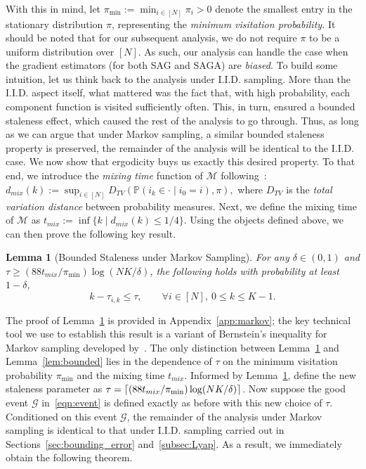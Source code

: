 \documentclass{article}
\theoremstyle{plain}
\newtheorem{lemma}[theorem]{Lemma}
\theoremstyle{definition}
\newcommand{\cG}{\mathcal{G}}
\newcommand{\cM}{\mathcal{M}}
\DeclarePairedDelimiter{\ceil}{\lceil}{\rceil}
\begin{document}
With this in mind, let $\pi_{\min}:=\min_{i\in[N]}\pi_i >0$ denote the smallest entry in the stationary distribution $\pi$, representing the \emph{minimum visitation probability.} It should be noted that for our subsequent analysis, we do not require $\pi$ to be a uniform distribution over $[N]$. As such, our analysis can handle the case when the gradient estimators (for both SAG and SAGA) are \emph{biased}. To build some intuition, let us think back to the analysis under I.I.D. sampling. More than the I.I.D. aspect itself, what mattered was the fact that, with high probability, each component function is visited sufficiently often. This, in turn, ensured a bounded staleness effect, which caused the rest of the analysis to go through. Thus, as long as we can argue that under Markov sampling, a similar bounded staleness property is preserved, the remainder of the analysis will be identical to the I.I.D. case. We now show that ergodicity buys us exactly this desired property. To that end, we introduce the \textit{mixing time} function of $\cM$ following~\citet{dorfman}: $d_{mix}(k) := \sup_{i \in [N]} D_{TV}\left(\mathbb{P}(i_k \in \cdot\mid i_0 =i), \pi \right),$ where $D_{TV}$ is the \textit{total variation distance} between probability measures. Next, we define the mixing time of $\cM$ as $t_{mix} := \inf \{k\mid d_{mix}(k) \leq 1/4\}$. Using the objects defined above, we can then prove the following key result. 


\begin{lemma}[Bounded Staleness under Markov Sampling]\label{lem:bounded_markov}
For any $\delta\in(0,1)$ and $\tau\geq (88t_{mix}/\pi_{\min})\log (NK/\delta)$, the following holds with probability at least $1-\delta$,
\begin{equation}
    k-\tau_{i,k}\leq \tau, \qquad \forall i\in[N], \ 0\leq k\leq K-1.
\end{equation}
\end{lemma}
 The proof of Lemma~\ref{lem:bounded_markov} is provided in Appendix~\ref{app:markov}; the key technical tool we use to establish this result is a variant of Bernstein's inequality for Markov sampling developed by~\citet{paulin2015concentration}. The only distinction between Lemma~\ref{lem:bounded_markov} and Lemma~\ref{lem:bounded} lies in the dependence of $\tau$ on the minimum visitation probability $\pi_{\min}$ and the mixing time $t_{mix}$. Informed by Lemma~\ref{lem:bounded_markov}, define the new staleness parameter as $\tau = \ceil{(88t_{mix}/\pi_{\min})\log (NK/\delta)}$. Now suppose the good event $\cG$ in~\eqref{eqn:event} is defined exactly as before with this new choice of $\tau.$ Conditioned on this event $\cG$, the remainder of the analysis under Markov sampling is identical to that under I.I.D. sampling carried out in Sections~\ref{sec:bounding_error} and~\ref{subsec:Lyap}. As a result, we immediately obtain the following theorem. 
 
\end{document}

